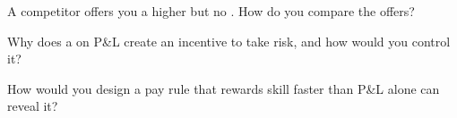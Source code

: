 \begin{interviewq}\label{iq:fm:hiring-and-compensation:4}
A competitor offers you a higher  but no . How do you compare the offers?
\end{interviewq}

\begin{interviewq}\label{iq:fm:hiring-and-compensation:5}
Why does a  on P\&L create an incentive to take risk, and how would you control it?
\end{interviewq}

\begin{interviewq}\label{iq:fm:hiring-and-compensation:6}
How would you design a pay rule that rewards skill faster than P\&L alone can reveal it?
\end{interviewq}
